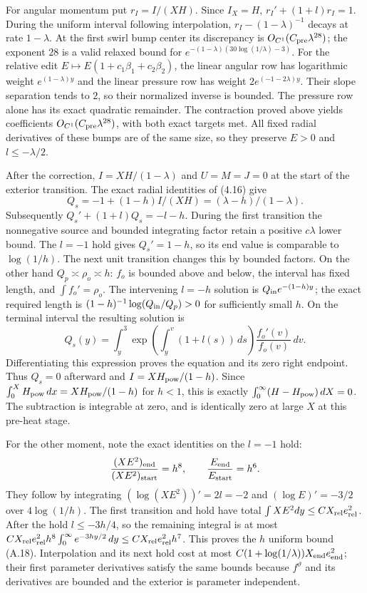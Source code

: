 \documentclass[10pt,a4paper]{article}
\begin{document}
For angular momentum put $r_I=I/(XH)$. Since $I_X=H$,
$r_I'+(1+l)r_I=1$. During the uniform interval following interpolation,
$r_I-(1-\lambda)^{-1}$ decays at rate $1-\lambda$.
At the first swirl bump center its discrepancy is
$O_{C^1}(C_{\rm pre}\lambda^{28})$; the exponent $28$ is a valid relaxed
bound for $e^{-(1-\lambda)(30\log(1/\lambda)-3)}$.
For the relative edit $E\mapsto E(1+c_1\beta_1+c_2\beta_2)$,
the linear angular row has logarithmic weight $e^{(1-\lambda)y}$ and
the linear pressure row has weight $2e^{(-1-2\lambda)y}$.
Their slope separation tends to $2$, so their normalized inverse is bounded.
The pressure row alone has its exact quadratic remainder. The contraction
proved above yields coefficients $O_{C^1}(C_{\rm pre}\lambda^{28})$,
with both exact targets met. All fixed radial derivatives of these bumps
are of the same size, so they preserve $E>0$ and $l\le-\lambda/2$.

After the correction, $I=XH/(1-\lambda)$ and $U=M=J=0$ at the start
of the exterior transition. The exact radial identities of (4.16) give
\[
Q_s=-1+(1-h)I/(XH)=(\lambda-h)/(1-\lambda).
\]
Subsequently $Q_s'+(1+l)Q_s=-l-h$. During the first transition the
nonnegative source and bounded integrating factor retain a positive $c\lambda$
lower bound. The $l=-1$ hold gives $Q_s'=1-h$, so its end value is comparable
to $\log(1/h)$. The next unit transition changes this by bounded factors.
On the other hand $Q_p\asymp\rho_o\asymp h$: $f_o$ is bounded above and
below, the interval has fixed length, and $\int f_o'=\rho_o$.
The intervening $l=-h$ solution is $Q_{\rm in}e^{-(1-h)y}$; the exact required
length is $(1-h)^{-1}\log(Q_{\rm in}/Q_p)>0$ for sufficiently small $h$.
On the terminal interval the resulting solution is
\[
Q_s(y)=\int_y^3\exp\left(\int_y^v(1+l(s))\,ds\right)
\frac{f_o'(v)}{f_o(v)}\,dv.
\]
Differentiating this expression proves the equation and its zero right endpoint.
Thus $Q_s=0$ afterward and $I=XH_{\rm pow}/(1-h)$. Since
$\int_0^XH_{\rm pow}\,dx=XH_{\rm pow}/(1-h)$ for $h<1$, this is exactly
$\int_0^\infty(H-H_{\rm pow})\,dX=0$. The subtraction is integrable at
zero, and is identically zero at large $X$ at this pre-heat stage.

For the other moment, note the exact identities on the $l=-1$ hold:
\[
\frac{(XE^2)_{\rm end}}{(XE^2)_{\rm start}}=h^8,
\qquad \frac{E_{\rm end}}{E_{\rm start}}=h^6.
\]
They follow by integrating $(\log(XE^2))'=2l=-2$ and
$(\log E)'=-3/2$ over $4\log(1/h)$.
The first transition and hold have total $\int XE^2dy\le CX_{\rm rel}e_{\rm rel}^2$.
After the hold $l\le-3h/4$, so the remaining integral is at most
$CX_{\rm rel}e_{\rm rel}^2h^8\int_0^\infty e^{-3hy/2}\,dy
\le CX_{\rm rel}e_{\rm rel}^2h^7$. This proves the $h$ uniform bound (A.18).
Interpolation and its next hold cost at most
$C(1+\log(1/\lambda))X_{\rm end}e_{\rm end}^2$; their first parameter
derivatives satisfy the same bounds because $f^{\vartheta}$ and its derivatives
are bounded and the exterior is parameter independent.
\end{document}
